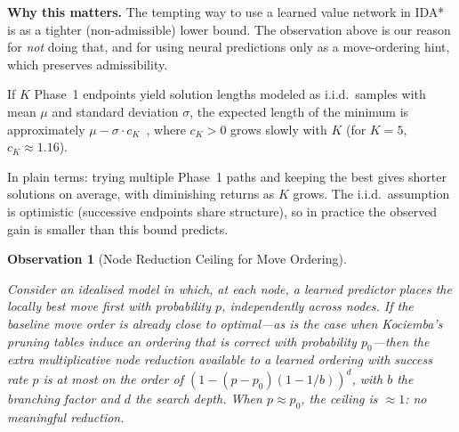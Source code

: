 \documentclass[graybox]{svmult}
\newtheorem{observation}{Observation}
\begin{document}
\textbf{Why this matters.} The tempting way to use a learned value network in IDA* is as a tighter (non-admissible) lower bound. The observation above is our reason for \emph{not} doing that, and for using neural predictions only as a move-ordering hint, which preserves admissibility.

\begin{proposition}
\label{prop:order-stat}
If $K$ Phase~1 endpoints yield solution lengths modeled as i.i.d.\ samples with mean $\mu$ and standard deviation $\sigma$, the expected length of the minimum is approximately $\mu - \sigma \cdot c_K$~\cite{david2003}, where $c_K > 0$ grows slowly with $K$ (for $K{=}5$, $c_K \approx 1.16$).
\end{proposition}

\noindent In plain terms: trying multiple Phase~1 paths and keeping the best gives shorter solutions on average, with diminishing returns as $K$ grows. The i.i.d.\ assumption is optimistic (successive endpoints share structure), so in practice the observed gain is smaller than this bound predicts.

\begin{observation}[Node Reduction Ceiling for Move Ordering]
\label{thm:node-reduction}
\begin{sloppypar}
Consider an idealised model in which, at each node, a learned predictor places the locally best move first with probability $p$, independently across nodes. If the baseline move order is already close to optimal---as is the case when Kociemba's pruning tables induce an ordering that is correct with probability $p_0$---then the extra multiplicative node reduction available to a learned ordering with success rate $p$ is at most on the order of $(1 - (p - p_0)(1 - 1/b))^d$, with $b$ the branching factor and $d$ the search depth. When $p \approx p_0$, the ceiling is $\approx 1$: no meaningful reduction.
\end{sloppypar}
\end{observation}
\end{document}
